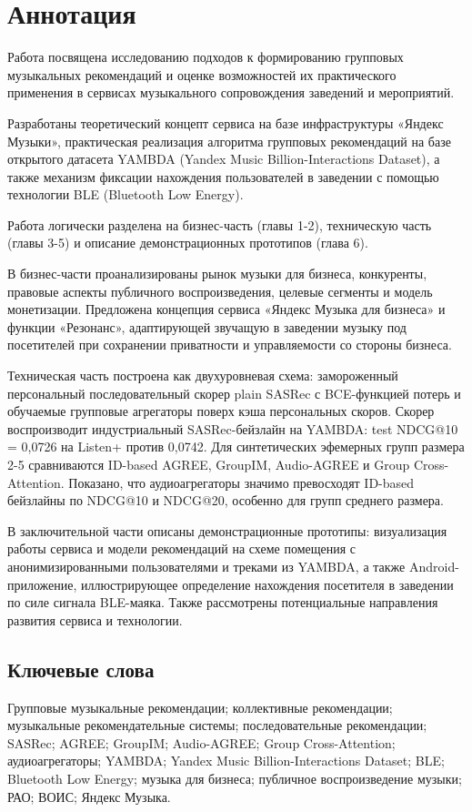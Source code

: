 \chapter*{Аннотация}

Работа посвящена исследованию подходов к формированию групповых музыкальных рекомендаций и оценке возможностей их практического применения в сервисах музыкального сопровождения заведений и мероприятий. 

Разработаны теоретический концепт сервиса на базе инфраструктуры «Яндекс Музыки», практическая реализация алгоритма групповых рекомендаций на базе открытого датасета YAMBDA (Yandex Music Billion-Interactions Dataset), а также механизм фиксации нахождения пользователей в заведении с помощью технологии BLE (Bluetooth Low Energy).

Работа логически разделена на бизнес-часть (главы 1-2), техническую часть (главы 3-5) и описание демонстрационных прототипов (глава 6).

В бизнес-части проанализированы рынок музыки для бизнеса, конкуренты, правовые аспекты публичного воспроизведения, целевые сегменты и модель монетизации. Предложена концепция сервиса «Яндекс Музыка для бизнеса» и функции «Резонанс», адаптирующей звучащую в заведении музыку под посетителей при сохранении приватности и управляемости со стороны бизнеса.

Техническая часть построена как двухуровневая схема: замороженный персональный последовательный скорер plain SASRec с BCE-функцией потерь и обучаемые групповые агрегаторы поверх кэша персональных скоров. Скорер воспроизводит индустриальный SASRec-бейзлайн на YAMBDA: test NDCG@10 = 0,0726 на Listen+ против 0,0742. Для синтетических эфемерных групп размера 2-5 сравниваются ID-based AGREE, GroupIM, Audio-AGREE и Group Cross-Attention. Показано, что аудиоагрегаторы значимо превосходят ID-based бейзлайны по NDCG@10 и NDCG@20, особенно для групп среднего размера.

В заключительной части описаны демонстрационные прототипы: визуализация работы сервиса и модели рекомендаций на схеме помещения с анонимизированными пользователями и треками из YAMBDA, а также Android-приложение, иллюстрирующее определение нахождения посетителя в заведении по силе сигнала BLE-маяка. Также рассмотрены потенциальные направления развития сервиса и технологии.

\section*{Ключевые слова}

Групповые музыкальные рекомендации; коллективные рекомендации; музыкальные рекомендательные системы; последовательные рекомендации; SASRec; AGREE; GroupIM; Audio-AGREE; Group Cross-Attention; аудиоагрегаторы; YAMBDA; Yandex Music Billion-Interactions Dataset; BLE; Bluetooth Low Energy; музыка для бизнеса; публичное воспроизведение музыки; РАО; ВОИС; Яндекс Музыка.
